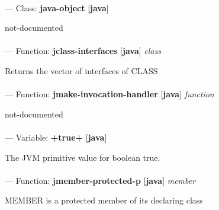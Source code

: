\paragraph{}
\label{JAVA:JAVA-OBJECT}
--- Class: \textbf{java-object} [\textbf{java}] \textit{}

\begin{adjustwidth}{5em}{5em}
not-documented
\end{adjustwidth}

\paragraph{}
\label{JAVA:JCLASS-INTERFACES}
--- Function: \textbf{jclass-interfaces} [\textbf{java}] \textit{class}

\begin{adjustwidth}{5em}{5em}
Returns the vector of interfaces of CLASS
\end{adjustwidth}

\paragraph{}
\label{JAVA:JMAKE-INVOCATION-HANDLER}
--- Function: \textbf{jmake-invocation-handler} [\textbf{java}] \textit{function}

\begin{adjustwidth}{5em}{5em}
not-documented
\end{adjustwidth}

\paragraph{}
\label{JAVA:+TRUE+}
--- Variable: \textbf{+true+} [\textbf{java}] \textit{}

\begin{adjustwidth}{5em}{5em}
The JVM primitive value for boolean true.
\end{adjustwidth}

\paragraph{}
\label{JAVA:JMEMBER-PROTECTED-P}
--- Function: \textbf{jmember-protected-p} [\textbf{java}] \textit{member}

\begin{adjustwidth}{5em}{5em}
MEMBER is a protected member of its declaring class
\end{adjustwidth}

